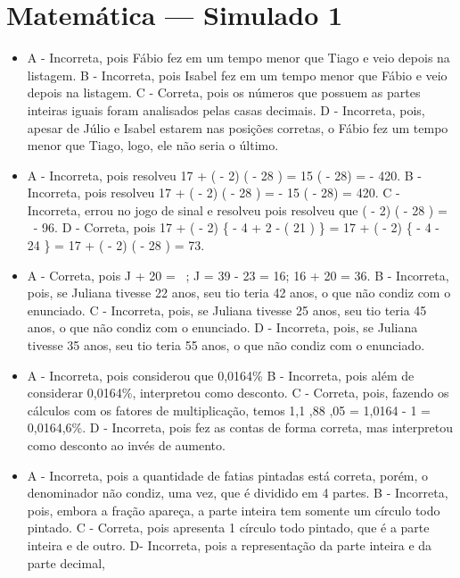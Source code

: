 \section*{Matemática — Simulado 1}
\begin{itemize}
\item A - Incorreta, pois Fábio fez em um tempo menor que Tiago e veio depois
na listagem.
B - Incorreta, pois Isabel fez em um tempo menor que Fábio e veio depois
na listagem.
C - Correta, pois os números que possuem as partes inteiras iguais foram
analisados pelas casas decimais.
D - Incorreta, pois, apesar de Júlio e Isabel estarem nas posições
corretas, o Fábio fez um tempo menor que Tiago, logo, ele não seria o
último.
\item A - Incorreta, pois resolveu
17 + ( - 2) \times \left( - 28 \right) = 15 \times ( - 28) = - 420.
B - Incorreta, pois resolveu
17 + ( - 2) \times \left( - 28 \right) = - 15 \times ( - 28) = 420. 
C - Incorreta, errou no jogo de sinal e resolveu pois resolveu que
( - 2) \times \left( - 28 \right) = \  - 96.
D - Correta, pois
17 + ( - 2) \times \left\{ - 4 + 2 \times \left{} - \left( 21 \right) \right\rbrack \right\} = 17 + ( - 2) \times \left\{ - 4 - 24 \right\} = 17 + ( - 2) \times \left( - 28 \right) = 73.
\item A - Correta, pois J + 20 = \ ; J = 39 - 23 = 16; 16 + 20 = 36.
B - Incorreta, pois, se Juliana tivesse 22 anos, seu tio teria 42 anos,
o que não condiz com o enunciado.
C - Incorreta, pois, se Juliana tivesse 25 anos, seu tio teria 45 anos,
o que não condiz com o enunciado.
D - Incorreta, pois, se Juliana tivesse 35 anos, seu tio teria 55 anos,
o que não condiz com o enunciado.
\item A - Incorreta, pois considerou que 0,0164\%
B - Incorreta, pois além de considerar 0,0164\%,
interpretou como desconto.
C - Correta, pois, fazendo os cálculos com os fatores de multiplicação,
temos 1,1 ,88 ,05 = 1,0164 - 1 = 0,0164,6\%.
D - Incorreta, pois fez as contas de forma correta, mas interpretou como
desconto ao invés de aumento.
\item A - Incorreta, pois a quantidade de fatias pintadas está correta, porém,
o denominador não condiz, uma vez, que é dividido em 4 partes.
B - Incorreta, pois, embora a fração  apareça, a parte
inteira tem somente um círculo todo pintado.
C - Correta, pois apresenta 1 círculo todo pintado, que é a parte
inteira e  de outro.
D- Incorreta, pois a representação da parte inteira e da parte decimal,

\end{itemize}
